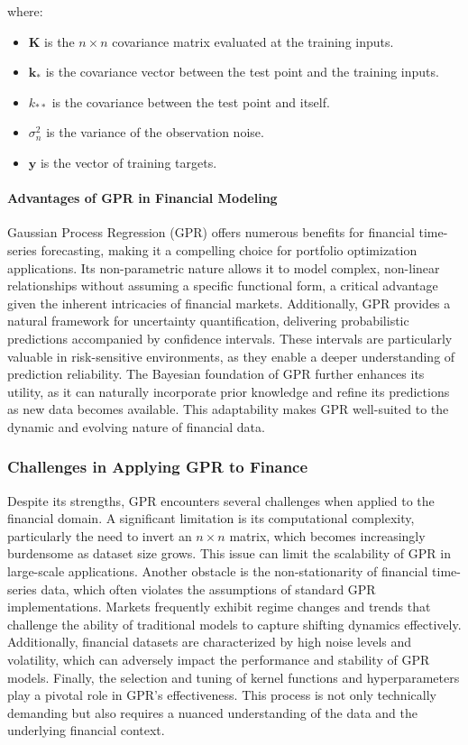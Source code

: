 where:

\begin{itemize}
    \item $\mathbf{K}$ is the $n \times n$ covariance matrix evaluated at the training inputs.
    \item $\mathbf{k}_*$ is the covariance vector between the test point and the training inputs.
    \item $k_{**}$ is the covariance between the test point and itself.
    \item $\sigma_n^2$ is the variance of the observation noise.
    \item $\mathbf{y}$ is the vector of training targets.
\end{itemize}

\paragraph{Advantages of GPR in Financial Modeling}

Gaussian Process Regression (GPR) offers numerous benefits for financial time-series forecasting, making it a compelling choice for portfolio optimization applications. Its non-parametric nature allows it to model complex, non-linear relationships without assuming a specific functional form, a critical advantage given the inherent intricacies of financial markets. Additionally, GPR provides a natural framework for uncertainty quantification, delivering probabilistic predictions accompanied by confidence intervals. These intervals are particularly valuable in risk-sensitive environments, as they enable a deeper understanding of prediction reliability. The Bayesian foundation of GPR further enhances its utility, as it can naturally incorporate prior knowledge and refine its predictions as new data becomes available. This adaptability makes GPR well-suited to the dynamic and evolving nature of financial data.

\subsubsection{Challenges in Applying GPR to Finance}
Despite its strengths, \ac{GPR} encounters several challenges when applied to the financial domain. A significant limitation is its computational complexity, particularly the need to invert an $n \times n$ matrix, which becomes increasingly burdensome as dataset size grows. This issue can limit the scalability of \ac{GPR} in large-scale applications. 
Another obstacle is the non-stationarity of financial time-series data, which often violates the assumptions of standard \ac{GPR} implementations. Markets frequently exhibit regime changes and trends that challenge the ability of traditional models to capture shifting dynamics effectively. 
Additionally, financial datasets are characterized by high noise levels and volatility, which can adversely impact the performance and stability of \ac{GPR} models. 
Finally, the selection and tuning of kernel functions and hyperparameters play a pivotal role in \ac{GPR}'s effectiveness. This process is not only technically demanding but also requires a nuanced understanding of the data and the underlying financial context.

